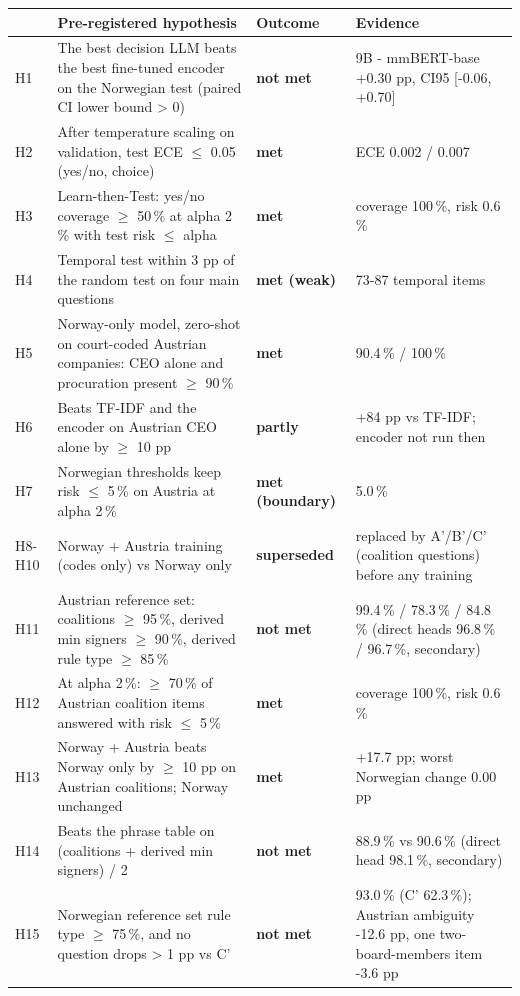 \begin{tabular}{@{}lp{6.2cm}lp{4.6cm}@{}}
\toprule
 & Pre-registered hypothesis & Outcome & Evidence \\
\midrule
H1 & The best decision LLM beats the best fine-tuned encoder on the Norwegian test (paired CI lower bound > 0) & \textbf{not met} & 9B - mmBERT-base +0.30 pp, CI95 [-0.06, +0.70] \\
H2 & After temperature scaling on validation, test ECE $\le$ 0.05 (yes/no, choice) & \textbf{met} & ECE 0.002 / 0.007 \\
H3 & Learn-then-Test: yes/no coverage $\ge$ 50\,\% at alpha 2\,\% with test risk $\le$ alpha & \textbf{met} & coverage 100\,\%, risk 0.6\,\% \\
H4 & Temporal test within 3 pp of the random test on four main questions & \textbf{met (weak)} & 73-87 temporal items \\
H5 & Norway-only model, zero-shot on court-coded Austrian companies: CEO alone and procuration present $\ge$ 90\,\% & \textbf{met} & 90.4\,\% / 100\,\% \\
H6 & Beats TF-IDF and the encoder on Austrian CEO alone by $\ge$ 10 pp & \textbf{partly} & +84 pp vs TF-IDF; encoder not run then \\
H7 & Norwegian thresholds keep risk $\le$ 5\,\% on Austria at alpha 2\,\% & \textbf{met (boundary)} & 5.0\,\% \\
H8-H10 & Norway + Austria training (codes only) vs Norway only & \textbf{superseded} & replaced by A'/B'/C' (coalition questions) before any training \\
H11 & Austrian reference set: coalitions $\ge$ 95\,\%, derived min signers $\ge$ 90\,\%, derived rule type $\ge$ 85\,\% & \textbf{not met} & 99.4\,\% / 78.3\,\% / 84.8\,\% (direct heads 96.8\,\% / 96.7\,\%, secondary) \\
H12 & At alpha 2\,\%: $\ge$ 70\,\% of Austrian coalition items answered with risk $\le$ 5\,\% & \textbf{met} & coverage 100\,\%, risk 0.6\,\% \\
H13 & Norway + Austria beats Norway only by $\ge$ 10 pp on Austrian coalitions; Norway unchanged & \textbf{met} & +17.7 pp; worst Norwegian change 0.00 pp \\
H14 & Beats the phrase table on (coalitions + derived min signers) / 2 & \textbf{not met} & 88.9\,\% vs 90.6\,\% (direct head 98.1\,\%, secondary) \\
H15 & Norwegian reference set rule type $\ge$ 75\,\%, and no question drops > 1 pp vs C' & \textbf{not met} & 93.0\,\% (C' 62.3\,\%); Austrian ambiguity -12.6 pp, one two-board-members item -3.6 pp \\

\end{tabular}
